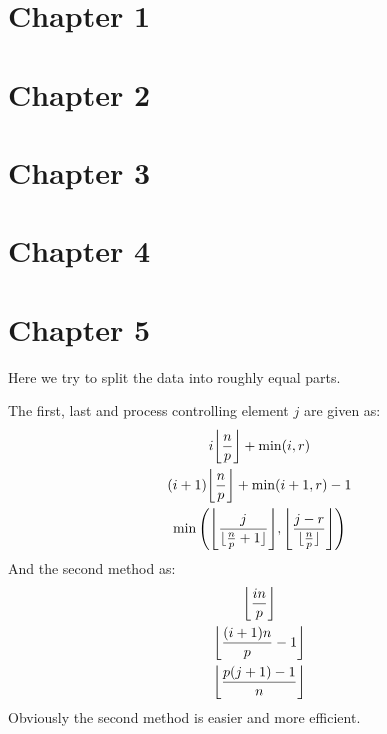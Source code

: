 \section{Chapter 1}


\section{Chapter 2}


\section{Chapter 3}


\section{Chapter 4}

\section{Chapter 5}

Here we try to split the data into roughly equal parts.

The first, last and process controlling element $j$ are given as:
\begin{gather*}
i \floor*{\frac{n}{p}} + \min( i,r)\\
(i+1) \floor*{\frac{n}{p}} + \min( i+1,r)-1\\
\min\left( \floor*{\frac{j}{\floor{\frac{n}{p}+1}} }, \floor*{ \frac{j-r}{\floor{\frac{n}{p}}}} \right)
\end{gather*}
And the second method as:
\begin{gather*}
\floor*{\frac{in }{p}}\\
\floor*{\frac{(i+1)n}{p} -1}\\
\floor*{\frac{p(j+1)-1}{n}}
\end{gather*}
Obviously the second method is easier and more efficient.